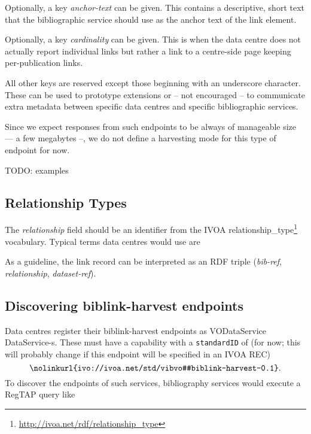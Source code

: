 \documentclass[11pt,a4paper]{ivoa}
\def\vocterm#1{\emph{\color{termcolor}#1}}
\def\vocterm{\startvocterm\realvocterm}
\def\realvocterm#1{\emph{\color{termcolor}#1}\endvocterm}
\gdef\breakablecolon{:\hskip0pt}
\gdef\startvocterm{\begingroup
  \catcode`\:=\active\let:=\breakablecolon}
\gdef\endvocterm{\endgroup}
\begin{document}
Optionally, a key \emph{anchor-text} can be given.  This contains a
descriptive, short text that the bibliographic service should use as
the anchor text of the link element.

Optionally, a key \emph{cardinality} can be given.  This is when the
data centre does not actually report individual links but rather a link
to a centre-side page keeping per-publication links.

All other keys are reserved except those beginning with an underscore
character.  These can be used to prototype extensions or -- not
encouraged -- to communicate extra metadata between specific data
centres and specific bibliographic services.

Since we expect responses from such endpoints to be always of manageable
size –– a few megabytes --, we do not define a harvesting mode for this
type of endpoint for now.

TODO: examples

\subsection{Relationship Types}

The \emph{relationship} field should be an identifier from the IVOA
relationship\_type\footnote{\url{http://ivoa.net/rdf/relationship_type}}
vocabulary.  Typical terms data centres would use are


As a guideline, the link record can be interpreted as an RDF triple
(\emph{bib-ref}, \emph{relationship}, \emph{dataset-ref}).


\subsection{Discovering biblink-harvest endpoints}

Data centres register their biblink-harvest endpoints as VODataService
\citep{2021ivoa.spec.1102D} DataService-s.  These must have a capability
with a \verb|standardID| of (for now; this will probably change if this
endpoint will be specified in an IVOA REC)
$$\hbox{\nolinkurl{ivo://ivoa.net/std/vibvo#biblink-harvest-0.1}}.$$
To discover the endpoints of such services, bibliography services would
execute a RegTAP query like
\end{document}
